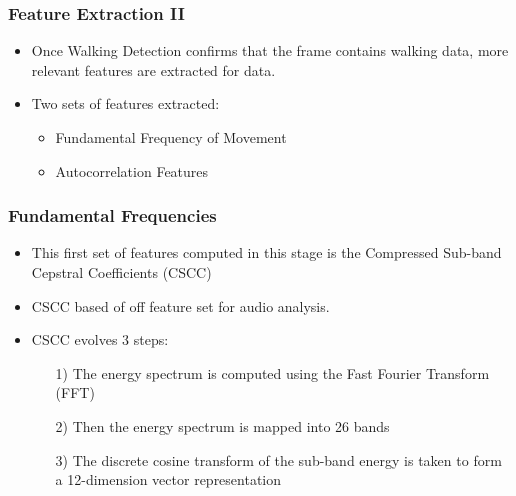 \documentclass{beamer}
\begin{document}
\begin{frame}
\frametitle{Feature Extraction II}
	\begin{itemize}
		\item Once Walking Detection confirms that the frame contains walking data, more relevant features are extracted for data.
		\item Two sets of features extracted:
		\begin{itemize}
			\item Fundamental Frequency of Movement
			\item Autocorrelation Features
		\end{itemize}
	\end{itemize}
\end{frame}

\begin{frame}
\frametitle{Fundamental Frequencies}
	\begin{itemize}
		\item This first set of features computed in this stage is the Compressed Sub-band Cepstral Coefficients (CSCC) 
		\item CSCC based of off feature set for audio analysis.
		\item CSCC evolves 3 steps:
		\begin{itemize}
			\item[1)] The energy spectrum is computed using the Fast Fourier Transform (FFT)
			\item[2)] Then the energy spectrum is mapped into 26 bands
			\item[3)] The discrete cosine transform of the sub-band energy is taken to form a 12-dimension vector representation
		\end{itemize}
	\end{itemize}
\end{frame}
\end{document}
